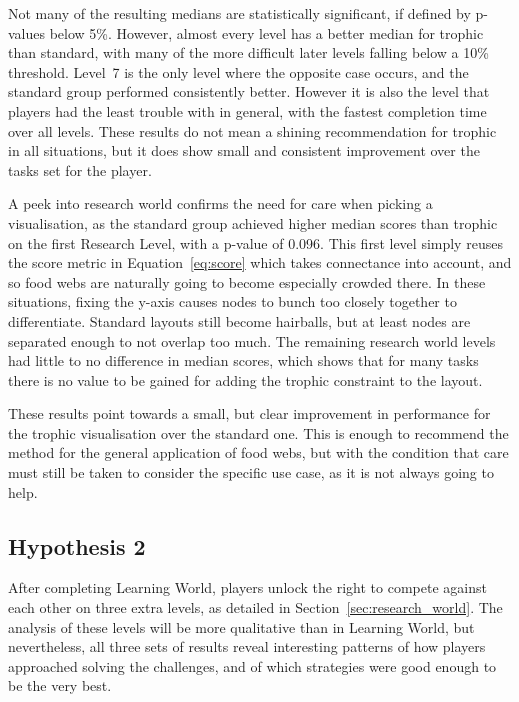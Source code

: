 Not many of the resulting medians are statistically significant, if defined by p-values below 5\%. However, almost every level has a better median for trophic than standard, with many of the more difficult later levels falling below a 10\% threshold.
Level~7 is the only level where the opposite case occurs, and the standard group performed consistently better. However it is also the level that players had the least trouble with in general, with the fastest completion time over all levels.
These results do not mean a shining recommendation for trophic in all situations, but it does show small and consistent improvement over the tasks set for the player.

A peek into research world confirms the need for care when picking a visualisation, as the standard group achieved higher median scores than trophic on the first Research Level, with a p-value of 0.096. This first level simply reuses the score metric in Equation~\eqref{eq:score} which takes connectance into account, and so food webs are naturally going to become especially crowded there. In these situations, fixing the y-axis causes nodes to bunch too closely together to differentiate. Standard layouts still become hairballs, but at least nodes are separated enough to not overlap too much.
The remaining research world levels had little to no difference in median scores, which shows that for many tasks there is no value to be gained for adding the trophic constraint to the layout.

These results point towards a small, but clear improvement in performance for the trophic visualisation over the standard one. This is enough to recommend the method for the general application of food webs, but with the condition that care must still be taken to consider the specific use case, as it is not always going to help.

\subsection{Hypothesis 2}
\label{sec:hypothesis2}

After completing Learning World, players unlock the right to compete against each other on three extra levels, as detailed in Section~\ref{sec:research_world}.
The analysis of these levels will be more qualitative than in Learning World, but nevertheless, all three sets of results reveal interesting patterns of how players approached solving the challenges, and of which strategies were good enough to be the very best.

